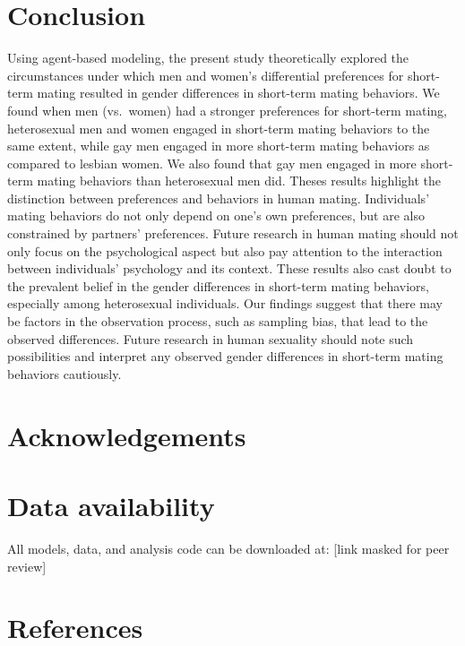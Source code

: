 \documentclass[
  11pt,
]{article}
\begin{document}
\hypertarget{conclusion}{%
\section{Conclusion}\label{conclusion}}

Using agent-based modeling, the present study theoretically explored the
circumstances under which men and women's differential preferences for
short-term mating resulted in gender differences in short-term mating
behaviors. We found when men (vs.~women) had a stronger preferences for
short-term mating, heterosexual men and women engaged in short-term
mating behaviors to the same extent, while gay men engaged in more
short-term mating behaviors as compared to lesbian women. We also found
that gay men engaged in more short-term mating behaviors than
heterosexual men did. Theses results highlight the distinction between
preferences and behaviors in human mating. Individuals' mating behaviors
do not only depend on one's own preferences, but are also constrained by
partners' preferences. Future research in human mating should not only
focus on the psychological aspect but also pay attention to the
interaction between individuals' psychology and its context. These
results also cast doubt to the prevalent belief in the gender
differences in short-term mating behaviors, especially among
heterosexual individuals. Our findings suggest that there may be factors
in the observation process, such as sampling bias, that lead to the
observed differences. Future research in human sexuality should note
such possibilities and interpret any observed gender differences in
short-term mating behaviors cautiously.

\hypertarget{acknowledgements}{%
\section{Acknowledgements}\label{acknowledgements}}

\hypertarget{data-availability}{%
\section{Data availability}\label{data-availability}}

All models, data, and analysis code can be downloaded at: {[}link masked
for peer review{]}

\newpage

\hypertarget{references}{%
\section*{References}\label{references}}
\end{document}
